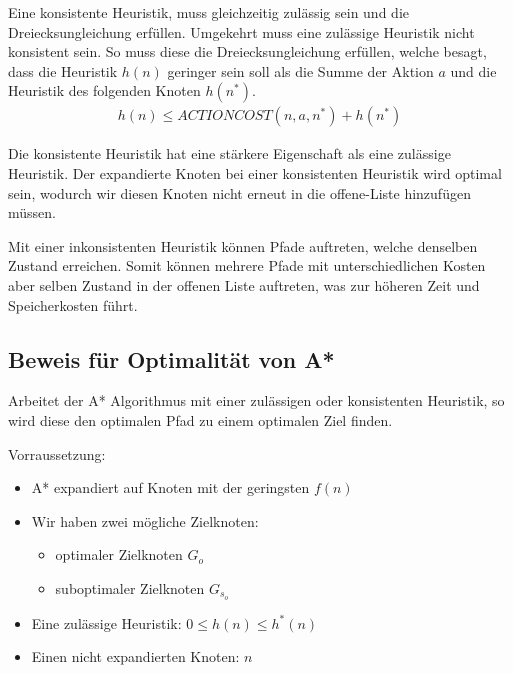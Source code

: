 Eine konsistente Heuristik, muss gleichzeitig zulässig sein und die Dreiecksungleichung erfüllen. Umgekehrt muss eine zulässige Heuristik nicht konsistent sein. So muss diese die Dreiecksungleichung erfüllen, welche besagt, dass die Heuristik $h(n)$ geringer sein soll als die Summe der Aktion $a$ und die Heuristik des folgenden Knoten $h(n^*)$. 
\begin{align*}
h(n) \leq ACTIONCOST(n,a,n^*) + h(n^*)
\end{align*}

Die konsistente Heuristik hat eine stärkere Eigenschaft als eine zulässige Heuristik. Der expandierte Knoten bei einer konsistenten Heuristik wird optimal sein, wodurch wir diesen Knoten nicht erneut in die offene-Liste hinzufügen müssen.

Mit einer inkonsistenten Heuristik können Pfade auftreten, welche denselben Zustand erreichen. Somit können mehrere Pfade mit unterschiedlichen Kosten aber selben Zustand in der offenen Liste auftreten, was zur höheren Zeit und Speicherkosten führt.

\subsection{Beweis für Optimalität von A*}
Arbeitet der A* Algorithmus mit einer zulässigen oder konsistenten Heuristik, so wird diese den optimalen Pfad zu einem optimalen Ziel finden.

Vorraussetzung:
\begin{itemize}
\item A* expandiert auf Knoten mit der geringsten $f(n)$
\item Wir haben zwei mögliche Zielknoten:
\begin{itemize}
	\item optimaler Zielknoten $G_o$
	\item suboptimaler Zielknoten $G_s_o$
\end{itemize}
\item Eine zulässige Heuristik: $0 \leq h(n) \leq h^*(n)$
\item Einen nicht expandierten Knoten: $n$
\end{itemize}


